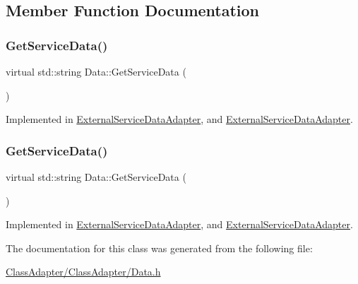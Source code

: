 \subsection{Member Function Documentation}
\mbox{\label{class_data_a0e2c25ed28d2e48b65f3c187ab0e5fa8}} 
\subsubsection{\texorpdfstring{GetServiceData()}{GetServiceData()}\hspace{0.1cm}{\footnotesize\ttfamily [1/2]}}
{\footnotesize\ttfamily virtual std\+::string Data\+::\+Get\+Service\+Data (\begin{DoxyParamCaption}\item[{\mbox{\hyperlink{_class_adapter_2_class_adapter_2_data_8h_aacb79576e5cf053ee9c93cb9d665e32b}{T\+Y\+P\+ES}}}]{ }\end{DoxyParamCaption})\hspace{0.3cm}{\ttfamily [pure virtual]}}



Implemented in \mbox{\hyperlink{class_external_service_data_adapter_aef7b123ab3e636ec263b609dae8bc4e7}{External\+Service\+Data\+Adapter}}, and \mbox{\hyperlink{class_external_service_data_adapter_aef7b123ab3e636ec263b609dae8bc4e7}{External\+Service\+Data\+Adapter}}.

\mbox{\label{class_data_a0e2c25ed28d2e48b65f3c187ab0e5fa8}} 
\subsubsection{\texorpdfstring{GetServiceData()}{GetServiceData()}\hspace{0.1cm}{\footnotesize\ttfamily [2/2]}}
{\footnotesize\ttfamily virtual std\+::string Data\+::\+Get\+Service\+Data (\begin{DoxyParamCaption}\item[{\mbox{\hyperlink{_class_adapter_2_class_adapter_2_data_8h_aacb79576e5cf053ee9c93cb9d665e32b}{T\+Y\+P\+ES}}}]{ }\end{DoxyParamCaption})\hspace{0.3cm}{\ttfamily [pure virtual]}}



Implemented in \mbox{\hyperlink{class_external_service_data_adapter_aef7b123ab3e636ec263b609dae8bc4e7}{External\+Service\+Data\+Adapter}}, and \mbox{\hyperlink{class_external_service_data_adapter_aef7b123ab3e636ec263b609dae8bc4e7}{External\+Service\+Data\+Adapter}}.



The documentation for this class was generated from the following file\+:\begin{DoxyCompactItemize}
\item 
\mbox{\hyperlink{_class_adapter_2_class_adapter_2_data_8h}{Class\+Adapter/\+Class\+Adapter/\+Data.\+h}}\end{DoxyCompactItemize}
